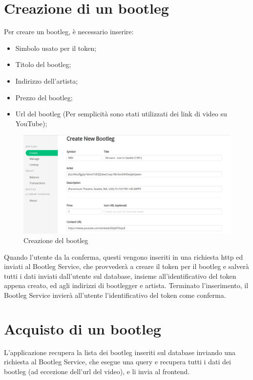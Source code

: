 \section{Creazione di un bootleg}

Per creare un bootleg, è necessario inserire:
\begin{itemize}
    \item Simbolo usato per il token;
    \item Titolo del bootleg;
    \item Indirizzo dell'artista;
    \item Prezzo del bootleg;
    \item Url del bootleg (Per semplicità sono stati utilizzati dei link di video su YouTube);
\end{itemize}

\begin{figure}[H]
    \includegraphics[width=\linewidth]{images/application/create-bootleg.png}
    \caption{Creazione del bootleg}
    \label{fig:bootleg_create}
\end{figure}

Quando l'utente da la conferma, questi vengono inseriti in una richiesta http ed inviati al Bootleg Service, che provvederà a creare il token per il bootleg e salverà tutti i dati inviati dall'utente sul database, insieme all'identificativo del token appena creato, ed agli indirizzi di bootlegger e artista. Terminato l'inserimento, il Bootleg Service invierà all'utente l'identificativo del token come conferma.

\section{Acquisto di un bootleg}

L'applicazione recupera la lista dei bootleg inseriti sul database inviando una richiesta al Bootleg Service, che esegue una query e recupera tutti i dati dei bootleg (ad eccezione dell'url del video), e li invia al frontend.

